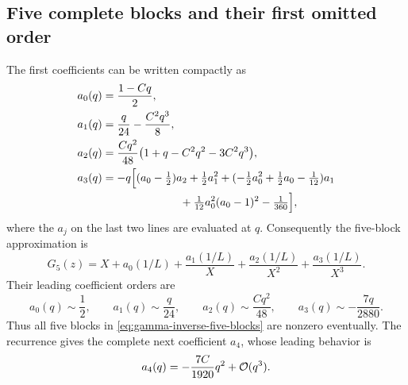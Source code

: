 \subsection{Five complete blocks and their first omitted order}

The first coefficients can be written compactly as
\begin{align}
 a_0(q)&=\frac{1-Cq}{2},\notag\\
 a_1(q)&=\frac q{24}-\frac{C^2q^3}{8},\notag\\
 a_2(q)&=\frac{Cq^2}{48}
             \bigl(1+q-C^2q^2-3C^2q^3\bigr),\notag\\
 a_3(q)&=-q\Bigl[
       (a_0-\tfrac12)a_2+\tfrac12a_1^2
       +(-\tfrac12a_0^2+\tfrac12a_0-\tfrac1{12})a_1\notag\\*
 &\hspace{7em}+\tfrac1{12}a_0^2(a_0-1)^2-\tfrac1{360}
       \Bigr],
 \label{eq:gamma-inverse-first-coefficients}
\end{align}
where the $a_j$ on the last two lines are evaluated at $q$.
Consequently the five-block approximation is
\begin{equation}
 G_5(z)=X+a_0(1/L)+\frac{a_1(1/L)}X
                +\frac{a_2(1/L)}{X^2}
                +\frac{a_3(1/L)}{X^3}.
 \label{eq:gamma-inverse-five-blocks}
\end{equation}
Their leading coefficient orders are
\[
 a_0(q)\sim\frac12,\qquad
 a_1(q)\sim\frac q{24},\qquad
 a_2(q)\sim\frac{Cq^2}{48},\qquad
 a_3(q)\sim-\frac{7q}{2880}.
\]
Thus all five blocks in \eqref{eq:gamma-inverse-five-blocks} are
nonzero eventually. The recurrence gives the complete next coefficient
$a_4$, whose leading behavior is
\begin{equation}
 a_4(q)=-\frac{7C}{1920}q^2+\mathcal O(q^3).
 \label{eq:gamma-inverse-frontier-coefficient}
\end{equation}

